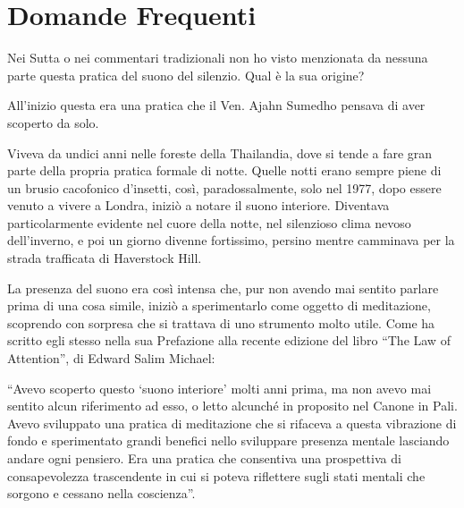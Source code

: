 \chapter{Domande Frequenti}

Nei Sutta o nei commentari tradizionali non ho visto menzionata da
nessuna parte questa pratica del suono del silenzio. Qual è la sua
origine?

\smallskip
\noindent
{}
All'inizio questa era una pratica che il Ven. Ajahn Sumedho pensava
di aver scoperto da solo.

Viveva da undici anni nelle foreste della Thailandia, dove si tende a
fare gran parte della propria pratica formale di notte. Quelle notti
erano sempre piene di un brusio cacofonico d'insetti, così,
paradossalmente, solo nel 1977, dopo essere venuto a vivere a Londra,
iniziò a notare il suono interiore. Diventava particolarmente evidente
nel cuore della notte, nel silenzioso clima nevoso dell'inverno, e poi
un giorno divenne fortissimo, persino mentre camminava per la strada
trafficata di Haverstock Hill.

La presenza del suono era così intensa che, pur non avendo mai sentito
parlare prima di una cosa simile, iniziò a sperimentarlo come oggetto di
meditazione, scoprendo con sorpresa che si trattava di uno strumento
molto utile. Come ha scritto egli stesso nella sua Prefazione alla
recente edizione del libro ``The Law of Attention'', di Edward Salim
Michael\cite{attention}:

``Avevo scoperto questo `suono interiore' molti anni prima, ma non avevo
mai sentito alcun riferimento ad esso, o letto alcunché in proposito nel
Canone in Pali. Avevo sviluppato una pratica di meditazione che si
rifaceva a questa vibrazione di fondo e sperimentato grandi benefici
nello sviluppare presenza mentale lasciando andare ogni pensiero. Era
una pratica che consentiva una prospettiva di consapevolezza
trascendente in cui si poteva riflettere sugli stati mentali che sorgono
e cessano nella coscienza''.

